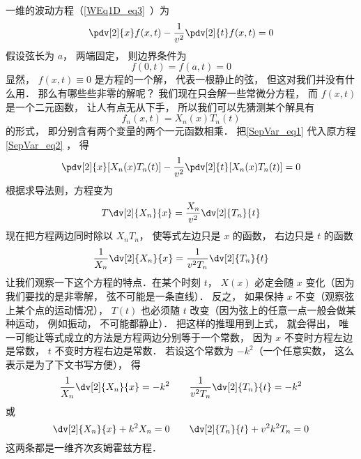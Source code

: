 一维的波动方程（\autoref{WEq1D_eq3}~）为
\begin{equation}
\pdv[2]{x} f(x, t) - \frac{1}{v^2} \pdv[2]{t}f(x, t) = 0
\end{equation}
假设弦长为 $a$， 两端固定， 则边界条件为
\begin{equation}\label{SepVar_eq3}
f(0, t) = f(a, t) = 0
\end{equation}
显然， $f(x, t) \equiv 0$ 是方程的一个解， 代表一根静止的弦， 但这对我们并没有什么用． 那么有哪些些非零的解呢？ 我们现在只会解一些常微分方程， 而 $f(x, t)$ 是一个二元函数， 让人有点无从下手， 所以我们可以先猜测某个解具有
\begin{equation}\label{SepVar_eq1}
f_n(x, t) = X_n(x) T_n(t)
\end{equation}
的形式， 即分别含有两个变量的两个一元函数相乘． 把\autoref{SepVar_eq1} 代入原方程\autoref{SepVar_eq2} ， 得
\begin{equation}
\pdv[2]{x}[X_n(x)T_n(t)] - \frac{1}{v^2}\pdv[2]{t} [X_n(x) T_n(t)] = 0
\end{equation}
根据求导法则，方程变为
\begin{equation}
T\dv[2]{X_n}{x} = \frac{X_n}{v^2} \dv[2]{T_n}{t}
\end{equation}
现在把方程两边同时除以 $X_nT_n$， 使等式左边只是 $x$ 的函数， 右边只是 $t$ 的函数
\begin{equation}
\frac{1}{X_n}\dv[2]{X_n}{x} = \frac{1}{v^2 T_n} \dv[2]{T_n}{t}
\end{equation}
让我们观察一下这个方程的特点．在某个时刻 $t$， $X(x)$ 必定会随 $x$ 变化（因为我们要找的是非零解， 弦不可能是一条直线）． 反之， 如果保持 $x$ 不变（观察弦上某个点的运动情况）， $T(t)$ 也必须随 $t$ 改变（因为弦上的任意一点一般会做某种运动， 例如振动， 不可能都静止）． 把这样的推理用到上式， 就会得出， 唯一可能让等式成立的方法是方程两边分别等于一个常数， 因为 $x$ 不变时方程左边是常数，  $t$ 不变时方程右边是常数． 若设这个常数为 $-k^2$（一个任意实数， 这么表示是为了下文书写方便）， 得
\begin{equation}
\frac{1}{X_n}\dv[2]{X_n}{x} = -k^2
\qquad
\frac{1}{v^2 T_n}\dv[2]{T_n}{t} = -k^2
\end{equation}
或
\begin{equation}
\dv[2]{X_n}{x} + k^2 X_n = 0
\qquad
\dv[2]{T_n}{t} + v^2k^2 T_n = 0
\end{equation}
这两条都是一维齐次亥姆霍兹方程．

